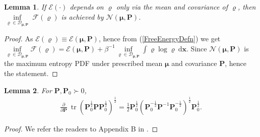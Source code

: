 \documentclass[letterpaper,10pt,twocolumn,conference]{ieeeconf}
\newtheorem{lemma}{Lemma}
\newcommand{\cD}{{\mathscr{D}}}
\newcommand{\tr}{\operatorname{tr}}
\begin{document}
\begin{lemma}\label{infFreeEnergyLemma}
If $\mathcal{E}(\cdot)$ depends on $\varrho$ only via the mean and covariance of $\varrho$, then $\underset{\varrho\in\cD_{\bm{\mu},\bm{P}}}{\inf} \; \mathcal{F}\left(\varrho\right)$ is achieved by $\mathcal{N}\left(\bm{\mu},\bm{P}\right)$.	
\end{lemma}
\begin{proof}
As $\mathcal{E}(\varrho)\equiv\mathcal{E}(\bm{\mu},\bm{P})$, hence from (\ref{FreeEnergyDefn}) we get $\underset{\varrho\in\cD_{\bm{\mu},\bm{P}}}{\inf} \mathcal{F}\left(\varrho\right) = \mathcal{E}(\bm{\mu},\bm{P}) + \beta^{-1}\underset{\varrho\in\cD_{\bm{\mu},\bm{P}}}{\inf} \int \varrho\log\varrho\:\mathrm{d}\bm{x}$. Since $\mathcal{N}(\bm{\mu},\bm{P})$ is the maximum entropy PDF under prescribed mean $\bm{\mu}$ and covariance $\bm{P}$, hence the statement.
\end{proof}


\begin{lemma}\label{MatrixDerivativeofWassCrossTermLemma}
For $\bm{P},\bm{P}_{0}\succ 0$,
\begin{eqnarray}\nonumber
\displaystyle\frac{\partial}{\partial\bm{P}}\:\tr\left(\bm{P}_{0}^{\frac{1}{2}} \bm{P} \bm{P}_{0}^{\frac{1}{2}}\right)^{\frac{1}{2}} = \displaystyle\frac{1}{2}\bm{P}_{0}^{\frac{1}{2}}\left(\bm{P}_{0}^{-\frac{1}{2}} \bm{P}^{-1} \bm{P}_{0}^{-\frac{1}{2}}\right)^{\frac{1}{2}}\bm{P}_{0}^{\frac{1}{2}}.
\label{MatrixDerivativeofWassCrossTerm}	
\end{eqnarray}
\end{lemma}
\begin{proof}
We refer the readers to Appendix B in \cite{HalderWendelACC2016}.	
\end{proof}



\end{document}
